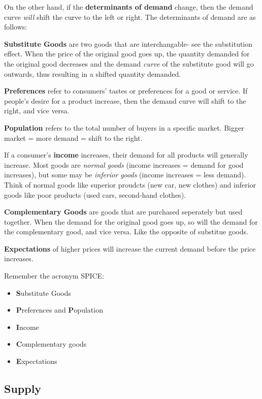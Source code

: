 \documentclass[12pt, a4paper]{article}
\theoremstyle{definition}
\begin{document}
On the other hand, if the \textbf{determinants of demand} change, then the demand curve \textit{will} shift the curve to the left or right.
The determinants of demand are as follows:

\textbf{Substitute Goods} are two goods that are interchangable- see the substitution effect.
When the price of the original good goes up, the quantity demanded for the original good decreases and the demand \textit{curve} of the substitute good will go outwards, thus resulting in a shifted quantity demanded.

\textbf{Preferences} refer to consumers' tastes or preferences for a good or service.
If people's desire for a product increase, then the demand curve will shift to the right, and vice versa.

\textbf{Population} refers to the total number of buyers in a specific market.
Bigger market = more demand = shift to the right.

If a consumer's \textbf{income} increases, their demand for all products will generally increase.
Most goods are \textit{normal goods} (income increases = demand for good increases), but some may be \textit{inferior goods} (income increases = less demand).
Think of normal goods like superior proudcts (new car, new clothes) and inferior goods like poor products (used cars, second-hand clothes).

\textbf{Complementary Goods} are goods that are purchased seperately but used together.
When the demand for the original good goes up, so will the demand for the complementary good, and vice versa.
Like the opposite of substitue goods.

\textbf{Expectations} of higher prices will increase the current demand before the price increases.

Remember the acronym SPICE:
\begin{itemize}
    \item \textbf{S}ubstitute Goods
    \item \textbf{P}references and \textbf{P}opulation
    \item \textbf{I}ncome
    \item \textbf{C}omplementary goods
    \item \textbf{E}xpectations
\end{itemize}

\subsection{Supply}
\end{document}
